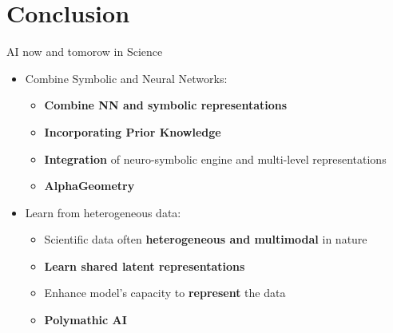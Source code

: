 \section{Conclusion}

\begin{frame}{\acs{AI} now and tomorow in Science}
  \begin{itemize}
  \item Combine Symbolic and Neural Networks:
    \begin{itemize}
    \item \textbf{Combine NN and symbolic representations} 
    \item \textbf{Incorporating Prior Knowledge} 
    \item \textbf{Integration} of neuro-symbolic engine and multi-level representations
    \item \textbf{AlphaGeometry}
    \end{itemize}

  \item Learn from heterogeneous data:
    \begin{itemize}
    \item Scientific data often \textbf{heterogeneous and multimodal} in nature
    \item \textbf{Learn shared latent representations}
    \item Enhance model's capacity to \textbf{represent} the data
    \item \textbf{Polymathic AI}
    \end{itemize}
  \end{itemize}
\end{frame}

